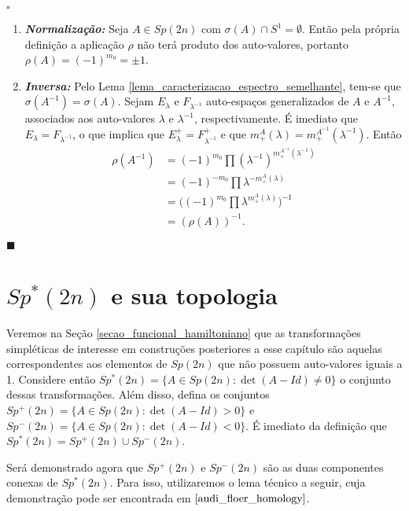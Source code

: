 \documentclass[12pt]{book}
\newenvironment{prova}[1]{$\square$ #1}{\hfill$\blacksquare$}
\newcommand{\autoespaco}[1]{E_{#1}}
\newcommand{\bigparenteses}[1]{\Big( #1 \Big) }
\newcommand{\circulo}{S^{1}}
\newcommand{\espectrooperador}[1]{\sigma(#1)}
\newcommand{\gruposimpletico}[1]{Sp(#1)}
\newcommand{\gruposimpleticonaodegenerado}[1]{Sp^{#1}(2n)}
\begin{document}
\begin{prova}
\begin{enumerate}
			\item \textbf{\textit{Normalização:}} Seja $A\in \gruposimpletico{2n}$ com $\sigma(A)\cap \circulo = \emptyset$. Então pela própria definição a aplicação $\rho$ não terá produto dos auto-valores, portanto $\rho(A) = (-1)^{m_{0}} = \pm 1$. 
			
			\item \textbf{\textit{Inversa:}} 	Pelo Lema \ref{lema_caracterizacao_espectro_semelhante}, tem-se que $\espectrooperador{A^{-1}} = \espectrooperador{A}$. Sejam $\autoespaco{\lambda}$ e $F_{\lambda^{-1}}$ auto-espaços generalizados de $A$ e $A^{-1}$, associados aos auto-valores $\lambda$ e $\lambda^{-1}$, respectivamente. É imediato que $\autoespaco{\lambda} = F_{\lambda^{-1}}$, o que implica que $\autoespaco{\lambda}^{+} = F_{\lambda^{-1}}^{+}$ e que $m^{A}_{+}(\lambda) = m^{A^{-1}}_{+}(\lambda^{-1})$. Então
			$$
			\begin{aligned}
			\rho(A^{-1})
			&= (-1)^{m_{0}}\prod (\lambda^{-1})^{m_{+}^{A^{-1}}(\lambda^{-1})}
			\\
			&=(-1)^{-m_{0}}\prod \lambda^{-m_{+}^{A}(\lambda)}
			\\
			&=\bigparenteses{(-1)^{m_{0}}\prod \lambda^{m_{+}^{A}(\lambda)}}^{-1}
			\\
			&=(\rho(A)) ^{-1}.
			\end{aligned}
			$$
		\end{enumerate}
	\end{prova}
	
	\section{$\gruposimpleticonaodegenerado{*}$ e sua topologia}
	
	Veremos na Seção \ref{secao_funcional_hamiltoniano} que as transformações simpléticas de interesse em construções posteriores a esse capítulo são aquelas correspondentes aos elementos de $\gruposimpletico{2n}$ que não possuem auto-valores iguais a 1. Considere então $\gruposimpleticonaodegenerado{*}= \{ A \in \gruposimpletico{2n}: \det(A-Id)\neq 0 \}$ o conjunto dessas transformações. Além disso, defina os conjuntos $\gruposimpleticonaodegenerado{+}= \{ A \in \gruposimpletico{2n}: \det(A-Id)> 0 \}$ e $\gruposimpleticonaodegenerado{-}= \{ A \in \gruposimpletico{2n}: \det(A-Id)<0 \}$. É imediato da definição que $\gruposimpleticonaodegenerado{*}= \gruposimpleticonaodegenerado{+} \cup \gruposimpleticonaodegenerado{-} $.
	
	Será demonstrado agora que $\gruposimpleticonaodegenerado{+}$ e  $\gruposimpleticonaodegenerado{-}$ são as duas componentes conexas de $\gruposimpleticonaodegenerado{*}$. Para isso, utilizaremos o lema técnico a seguir, cuja demonstração pode ser encontrada em  $\cite{audi_floer_homology}$.
	
\end{document}
